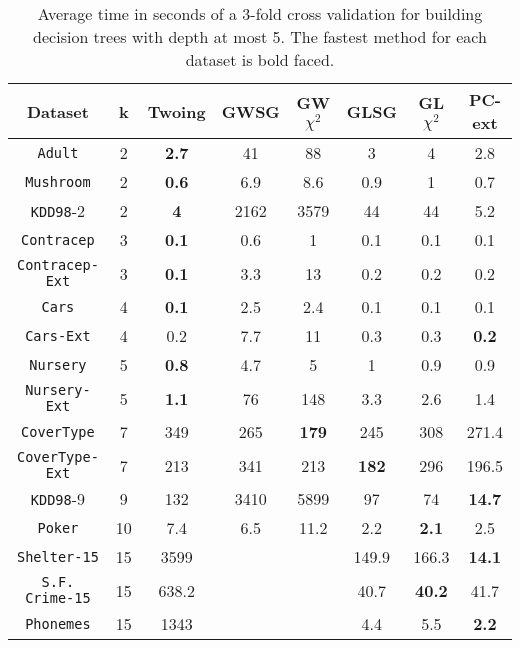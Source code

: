 \begin{table*}[]
\small
\centering
\caption{Average time in seconds of a 3-fold cross validation
for building decision trees with depth at most 5.
The fastest method for each dataset is bold faced.}
\begin{tabular}{c|c|c|c|c|c|c|c}
Dataset             & k  & Twoing    & GWSG  & GW$\chi^2$ & GLSG      & GL$\chi^2$ & PC-ext     \\ \hline
{\tt Adult}         & 2  & {\bf  2.7} & 41   & 88         & 3         & 4          & 2.8        \\
{\tt Mushroom}      & 2  & {\bf 0.6} & 6.9  & 8.6         & 0.9       & 1          & 0.7        \\
{\tt KDD98}-2       & 2  & {\bf 4}   & 2162 & 3579        & 44        & 44         & 5.2        \\
{\tt Contracep}     & 3  & {\bf 0.1} & 0.6  & 1           & 0.1       & 0.1        & 0.1        \\
{\tt Contracep-Ext} & 3  & {\bf 0.1} & 3.3  & 13          & 0.2       & 0.2        & 0.2        \\
{\tt Cars}          & 4  & {\bf 0.1} & 2.5  & 2.4         & 0.1       & 0.1        & 0.1        \\
{\tt Cars-Ext}      & 4  & 0.2       & 7.7  & 11          & 0.3       & 0.3        & {\bf 0.2}  \\
{\tt Nursery}       & 5  & {\bf 0.8} & 4.7  & 5           & 1         & 0.9        & 0.9        \\
{\tt Nursery-Ext}   & 5  & {\bf 1.1} & 76   & 148         & 3.3       & 2.6        & 1.4        \\
{\tt CoverType}     & 7  & 349       & 265  & {\bf 179}   & 245       & 308        & 271.4      \\
{\tt CoverType-Ext} & 7  & 213       & 341  & 213         & {\bf 182} & 296        & 196.5      \\
{\tt KDD98}-9       & 9  & 132       & 3410 & 5899        & 97        & 74         & {\bf 14.7 }\\ 
{\tt Poker}         & 10 & 7.4       & 6.5  & 11.2        & 2.2       & {\bf 2.1}  & 2.5        \\
{\tt Shelter-15}    & 15 & 3599      &      &             & 149.9     & 166.3      & {\bf 14.1 }\\   
{\tt S.F. Crime-15} & 15 & 638.2     &      &             & 40.7      & {\bf 40.2} & 41.7       \\ 
{\tt Phonemes}      & 15 & 1343      &      &             &      4.4  & 5.5        & {\bf 2.2 }
\end{tabular}
\label{tab:time}
\end{table*}



